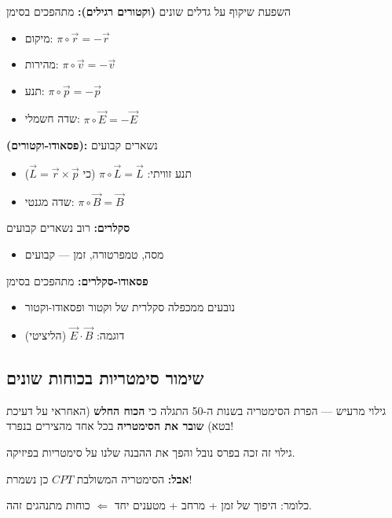 \begin{examplebox}{השפעת שיקוף על גדלים שונים}
    \textbf{ (וקטורים רגילים):} מתהפכים בסימן
\begin{itemize}
    \item מיקום: $\pi \circ \vec{r} = -\vec{r}$
    \item מהירות: $\pi \circ \vec{v} = -\vec{v}$
    \item תנע: $\pi \circ \vec{p} = -\vec{p}$
    \item שדה חשמלי: $\pi \circ \vec{E} = -\vec{E}$
\end{itemize}

    \textbf{ (פסאודו-וקטורים):} נשארים קבועים
\begin{itemize}
    \item תנע זוויתי: $\pi \circ \vec{L} = \vec{L}$ (כי $\vec{L} = \vec{r} \times \vec{p}$)
    \item שדה מגנטי: $\pi \circ \vec{B} = \vec{B}$
\end{itemize}

\textbf{סקלרים:} רוב נשארים קבועים
\begin{itemize}
    \item מסה, טמפרטורה, זמן — קבועים
\end{itemize}

\textbf{פסאודו-סקלרים:} מתהפכים בסימן
\begin{itemize}
    \item נובעים ממכפלה סקלרית של וקטור ופסאודו-וקטור
    \item דוגמה: $\vec{E} \cdot \vec{B}$ (הליציטי)
\end{itemize}
\end{examplebox}

\subsection{שימור סימטריות בכוחות שונים}


\begin{importantbox}{גילוי מרעיש — הפרת הסימטריה}
בשנות ה-50 התגלה כי \textbf{הכוח החלש} (האחראי על דעיכת בטא) \textbf{שובר את הסימטריה} בכל אחד מהצירים בנפרד!

גילוי זה זכה בפרס נובל והפך את ההבנה שלנו על סימטריות בפיזיקה.

\textbf{אבל:} הסימטריה המשולבת \textbf{$CPT$} כן נשמרת!

כלומר: היפוך של זמן + מרחב + מטענים יחד $\Leftarrow$ כוחות מתנהגים זהה.
\end{importantbox}

